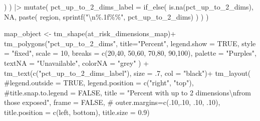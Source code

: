 \documentclass[
  letterpaper,
  DIV=11,
  numbers=noendperiod]{scrartcl}
\newenvironment{Shaded}{}{}
\newcommand{\AttributeTok}[1]{\textcolor[rgb]{0.84,0.23,0.29}{#1}}
\newcommand{\CommentTok}[1]{\textcolor[rgb]{0.42,0.45,0.49}{#1}}
\newcommand{\ConstantTok}[1]{\textcolor[rgb]{0.00,0.36,0.77}{#1}}
\newcommand{\DecValTok}[1]{\textcolor[rgb]{0.00,0.36,0.77}{#1}}
\newcommand{\FloatTok}[1]{\textcolor[rgb]{0.00,0.36,0.77}{#1}}
\newcommand{\FunctionTok}[1]{\textcolor[rgb]{0.44,0.26,0.76}{#1}}
\newcommand{\NormalTok}[1]{\textcolor[rgb]{0.14,0.16,0.18}{#1}}
\newcommand{\OtherTok}[1]{\textcolor[rgb]{0.44,0.26,0.76}{#1}}
\newcommand{\SpecialCharTok}[1]{\textcolor[rgb]{0.00,0.36,0.77}{#1}}
\newcommand{\StringTok}[1]{\textcolor[rgb]{0.01,0.18,0.38}{#1}}
\begin{document}
\begin{Shaded}
\begin{Highlighting}[]
\NormalTok{    )}
\NormalTok{  ) }\SpecialCharTok{|\textgreater{}} 
  \FunctionTok{mutate}\NormalTok{(}
    \AttributeTok{pct\_up\_to\_2\_dims\_label =} \FunctionTok{if\_else}\NormalTok{(}
      \FunctionTok{is.na}\NormalTok{(pct\_up\_to\_2\_dims), }
      \ConstantTok{NA}\NormalTok{, }
      \FunctionTok{paste}\NormalTok{(}
\NormalTok{        region,}
        \FunctionTok{sprintf}\NormalTok{(}\StringTok{"}\SpecialCharTok{\textbackslash{}n}\StringTok{\%.1f\%\%"}\NormalTok{, pct\_up\_to\_2\_dims)}
\NormalTok{      ) }
\NormalTok{    )}
\NormalTok{  )}
\end{Highlighting}
\end{Shaded}

\begin{Shaded}
\begin{Highlighting}[]
\NormalTok{map\_object }\OtherTok{\textless{}{-}}
\FunctionTok{tm\_shape}\NormalTok{(at\_risk\_dimensions\_map)}\SpecialCharTok{+}
  \FunctionTok{tm\_polygons}\NormalTok{(}\StringTok{"pct\_up\_to\_2\_dims"}\NormalTok{,}
              \AttributeTok{title=}\StringTok{"Percent"}\NormalTok{, }
              \AttributeTok{legend.show =} \ConstantTok{TRUE}\NormalTok{,}
              \AttributeTok{style =} \StringTok{"fixed"}\NormalTok{,}
              \AttributeTok{scale =} \DecValTok{10}\NormalTok{,}
              \AttributeTok{breaks =} \FunctionTok{c}\NormalTok{(}\DecValTok{20}\NormalTok{,}\DecValTok{40}\NormalTok{, }\DecValTok{50}\NormalTok{,}\DecValTok{60}\NormalTok{, }\DecValTok{70}\NormalTok{,}\DecValTok{80}\NormalTok{, }\DecValTok{90}\NormalTok{,}\DecValTok{100}\NormalTok{),}
              \AttributeTok{palette =} \StringTok{"Purples"}\NormalTok{,}
              \AttributeTok{textNA =} \StringTok{"Unavailable"}\NormalTok{,}
              \AttributeTok{colorNA =} \StringTok{"grey"}
\NormalTok{              ) }\SpecialCharTok{+}
  \FunctionTok{tm\_text}\NormalTok{(}\FunctionTok{c}\NormalTok{(}\StringTok{"pct\_up\_to\_2\_dims\_label"}\NormalTok{), }\AttributeTok{size =}\NormalTok{ .}\DecValTok{7}\NormalTok{, }\AttributeTok{col =} \StringTok{"black"}\NormalTok{)}\SpecialCharTok{+}
  \FunctionTok{tm\_layout}\NormalTok{(}
    \CommentTok{\#legend.outside = TRUE,}
    \AttributeTok{legend.position =} \FunctionTok{c}\NormalTok{(}\StringTok{"right"}\NormalTok{, }\StringTok{"top"}\NormalTok{),}
    \CommentTok{\#title.snap.to.legend = FALSE,}
    \AttributeTok{title =} 
      \StringTok{"Percent with up to 2 dimensions}\SpecialCharTok{\textbackslash{}n}\StringTok{from those exposed"}\NormalTok{,}
    \AttributeTok{frame =} \ConstantTok{FALSE}\NormalTok{,}
\CommentTok{\#            outer.margins=c(.10,.10, .10, .10), }
            \AttributeTok{title.position =} \FunctionTok{c}\NormalTok{(}\StringTok{\textquotesingle{}left\textquotesingle{}}\NormalTok{, }\StringTok{\textquotesingle{}bottom\textquotesingle{}}\NormalTok{),}
            \AttributeTok{title.size =} \FloatTok{0.9}\NormalTok{)}


\end{Highlighting}
\end{Shaded}
\end{document}
